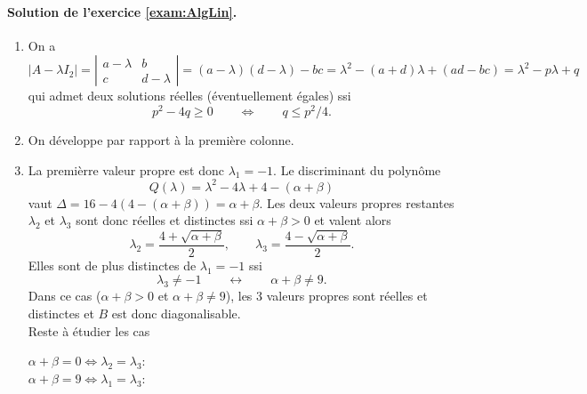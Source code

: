 

\paragraph{Solution de l'exercice \ref{exam:AlgLin}.}
  \begin{enumerate}
  \item On a 
  $$
  |A - \lambda I_2| 
  = \left|\begin{array}{cc} a - \lambda & b \\ c & d - \lambda \end{array}\right|
  = (a - \lambda)( d - \lambda) - bc
  = \lambda^2 - (a+d) \lambda + (ad - bc)
  = \lambda^2 - p \lambda + q
  $$
  qui admet deux solutions réelles (éventuellement égales) ssi
  $$
  p^2 - 4 q \geq 0
  \qquad \Leftrightarrow \qquad
  q \leq p^2 / 4.
  $$
  \item On développe par rapport à la première colonne.
  \item La premièrre valeur propre est donc $\lambda_1 = -1$. Le discriminant du polynôme 
  $$
  Q(\lambda) = \lambda^2 - 4 \lambda + 4 - (\alpha+\beta)
  $$
  vaut $\Delta = 16 - 4(4 - (\alpha+\beta)) = \alpha + \beta$. Les deux valeurs propres restantes $\lambda_2$ et $\lambda_3$ sont donc réelles et distinctes ssi $\alpha + \beta > 0$ et valent alors
  $$
  \lambda_2 = \frac{4 + \sqrt{\alpha + \beta}}{2}, 
  \qquad \lambda_3 = \frac{4 - \sqrt{\alpha + \beta}}{2}.
  $$
  Elles sont de plus distinctes de $\lambda_1 = -1$ ssi 
  $$
  \lambda_3 \neq -1 \qquad \leftrightarrow \qquad
  \alpha + \beta \neq 9.
  $$
  Dans ce cas ($\alpha + \beta > 0$ et $\alpha + \beta \neq 9$), les 3 valeurs propres sont réelles et distinctes et $B$ est donc diagonalisable. \\
  Reste à étudier les cas 
  \begin{description}
   \item[$\alpha + \beta = 0 \Leftrightarrow \lambda_2 = \lambda_3$:]  
   \item[$\alpha + \beta = 9 \Leftrightarrow \lambda_1 = \lambda_3$:]  
  \end{description}

  \end{enumerate}

